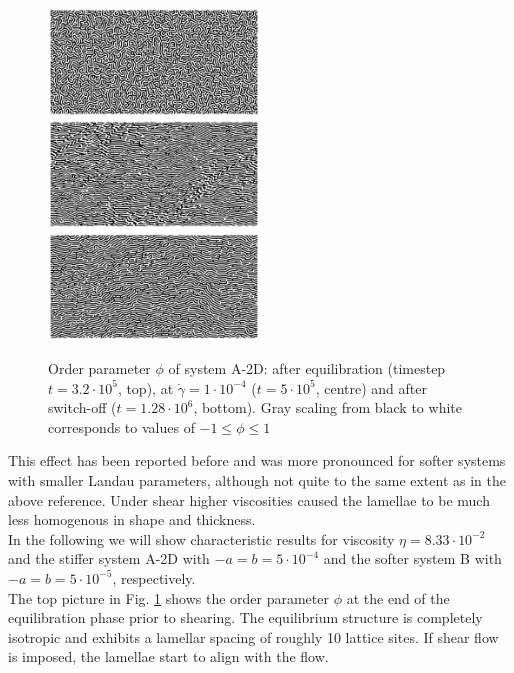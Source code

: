 \documentclass[8.5pt,twoside,twocolumn]{article}
\newcommand{\e}[1]{\cdot10^{#1}}
\begin{document}
\begin{figure}[htp!]
\centering
\includegraphics[angle=0,width=0.5\textwidth]{phi_run703_320.jpg}\\
\includegraphics[angle=0,width=0.5\textwidth]{phi_run704_500.jpg}\\
\includegraphics[angle=0,width=0.5\textwidth]{phi_run705_1280.jpg}
\caption{Order parameter $\phi$ of system A-2D: after equilibration (timestep $t=3.2\e{5}$, top), at $\dot{\gamma}=1\cdot10^{-4}$ ($t=5\e{5}$, centre) and after switch-off ($t=1.28\e{6}$, bottom). Gray scaling from black to white corresponds to values of $-1\le\phi\le1$}
\label{fig1}
\end{figure}

This effect has been reported before \cite{Gonnella97} and was more pronounced for softer systems with smaller Landau parameters, although not quite to the same extent as in the above reference.
Under shear higher viscosities caused the lamellae to be much less homogenous in shape and thickness.\\
In the following we will show characteristic results for viscosity $\eta=8.33\e{-2}$ and the stiffer system A-2D with $-a=b=5\e{-4}$ and the softer system B with $-a=b=5\e{-5}$, respectively.\\
The top picture in Fig. \ref{fig1} shows the order parameter $\phi$ at the end of the equilibration phase prior to shearing.
The equilibrium structure is completely isotropic and exhibits a lamellar spacing of roughly 10 lattice sites.
If shear flow is imposed, the lamellae start to align with the flow.
\end{document}
